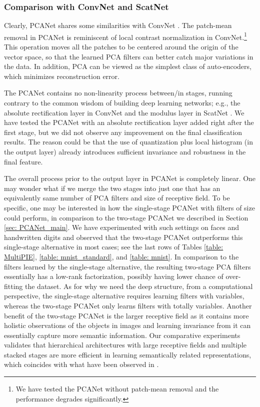 \documentclass[10pt,journal,compsoc]{IEEEtran}
\begin{document}
\subsubsection{Comparison with ConvNet and ScatNet}
Clearly, PCANet shares some similarities with ConvNet \cite{Jarrett2009}. The patch-mean removal in PCANet is reminiscent of local contrast normalization in ConvNet.\footnote{We have tested the PCANet without patch-mean removal and the performance degrades significantly.} This operation moves all the patches to be centered around the origin of the vector space, so that the learned PCA filters can better catch major variations in the data. In addition, PCA can be viewed as the simplest class of auto-encoders, which minimizes reconstruction error.

The PCANet contains no non-linearity process between/in stages, running contrary to the common wisdom of building deep learning networks; e.g., the absolute rectification layer in ConvNet \cite{Jarrett2009} and the modulus layer in ScatNet \cite{Bruna2013,Sifre2013}. We have tested the PCANet with an absolute rectification layer added right after the first stage, but we did not observe any improvement on the final classification results. The reason could be that the use of quantization plus local histogram (in the output layer) already introduces sufficient invariance and robustness in the final feature.


The overall process prior to the output layer in PCANet is completely linear. One may wonder what if we merge the two stages into just one that has an equivalently same number of PCA filters and size of receptive field. To be specific, one may be interested in how the single-stage PCANet with  filters of size  could perform, in comparison to the two-stage PCANet we described in Section \ref{sec: PCANet_main}. We have experimented with such settings on faces and handwritten digits and observed that the two-stage PCANet outperforms this single-stage alternative in most cases; see the last rows of Tables \ref{table: MultiPIE}, \ref{table: mnist_standard}, and \ref{table: mnist}. In comparison to the filters learned by the single-stage alternative, the resulting two-stage PCA filters essentially has a low-rank factorization, possibly having lower chance of over-fitting the dataset. As for why we need the deep structure, from a computational perspective, the single-stage alternative requires learning filters with  variables, whereas the two-stage PCANet only learns filters with totally  variables. Another benefit of the two-stage PCANet is the larger receptive field as it contains more holistic observations of the objects in images and learning invariance from it can essentially capture more semantic information. Our comparative experiments validates that hierarchical architectures with large receptive fields and multiple stacked stages are more efficient in learning semantically related representations, which coincides with what have been observed in \cite{Lee2009}.
\end{document}
